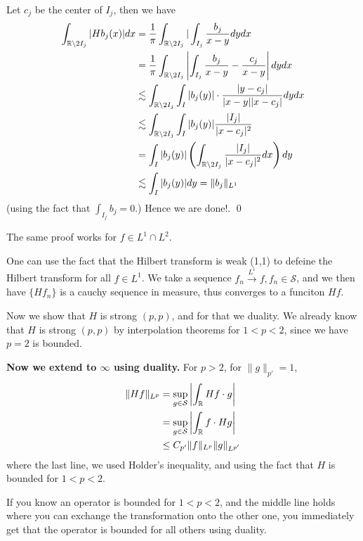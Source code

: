 Let $c_j$ be the center of $I_j$, then we have
\begin{align*}
    \int_{\mathbb{R}\setminus 2I_j}|Hb_j(x)|dx&=\frac{1}{\pi}\int_{\mathbb{R}\setminus 2I_j}|\int_{I_j}\frac{b_j}{x-y}dydx\\
    &=\frac{1}{\pi}\int_{\mathbb{R}\setminus 2I_j}\left|\int_{I_j}\frac{b_j}{x-y}-\frac{c_j}{x-y} \right|dydx\\
    &\lesssim \int_{\mathbb{R}\setminus 2I_j}\int_I|b_j(y)|\cdot\frac{|y-c_j|}{|x-y||x-c_j|}dydx\\
    &\lesssim \int_{\mathbb{R}\setminus 2I_j}\int_I|b_j(y)|\frac{|I_j|}{|x-c_j|^2}\\
    &=\int_I|b_j(y)|\left(\int_{\mathbb{R}\setminus 2I_j}\frac{|I_j|}{|x-c_j|^2}dx \right)dy\\
    &\lesssim \int_I|b_j(y)|dy=\|b_j\|_{L^1}
\end{align*}
(using the fact that $\int_{I_j}b_j=0$.) Hence we are done!.
\qed

\begin{note}
    The same proof works for $f\in L^1\cap L^2$.
\end{note}


One can use the fact that the Hilbert transform is weak (1,1) to defeine the Hilbert transform for all $f\in L^1$. We take a sequence $f_n\xrightarrow{L^1}f, f_n\in\mathcal{S}$, and  we then have $\{Hf_n\}$ is a cauchy sequence in measure, thus converges to a funciton $Hf$.

Now we show that $H$ is strong $(p,p)$, and for that we duality. We already know that $H$ is strong $(p,p)$ by interpolation theorems for $1<p<2$, since we have $p=2$ is bounded.

\textbf{ Now we extend to $\infty$ using duality. } For $p>2$, for $\|g\|_{p'}=1$,
\begin{align*}
    \|Hf\|_{L^p}&=\sup_{g\in\mathcal{S}}\left|\int_{\mathbb{R}} Hf\cdot g \right|\\
    &=\sup_{g\in\mathcal{S}} \left| \int_{\mathbb{R}} f\cdot Hg\right|\\
    &\leq C_{p'}\|f\|_{L^p}\|g\|_{L^{p'}}
\end{align*}
where the last line, we used Holder's inequality, and using the fact that $H$ is bounded for $1<p<2$.

\begin{note}
    If you know an operator is bounded for $1<p<2$, and the middle line holds where you can exchange the transformation onto the other one, you immediately get that the operator is bounded for all others using duality.
\end{note}

